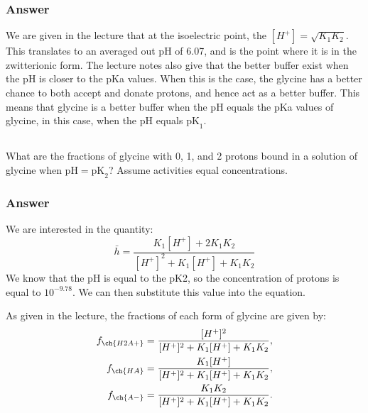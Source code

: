 \documentclass[12pt]{article}
\begin{document}
\subsubsection{Answer}
We are given in the lecture that at the isoelectric point, the $[H^+] = \sqrt{K_1K_2}$. This translates to an averaged out pH of 6.07, and is the point where it is in the zwitterionic form. The lecture notes also give that the better buffer exist when the pH is closer to the pKa values. When this is the case, the glycine has a better chance to both accept and donate protons, and hence act as a better buffer. This means that glycine is a better buffer when the pH equals the pKa values of glycine, in this case, when the pH equals $\mathrm{pK}_{1}$.

\subsection{}


What are the fractions of glycine with 0, 1, and 2 protons bound in a solution of glycine when $\mathrm{pH}=\mathrm{pK}_{2}$? Assume activities equal concentrations.
\subsubsection{Answer}
We are interested in the quantity:
\begin{equation}
  \bar{h} = \frac{K_1 [H^+] + 2K_1K_2}{[H^+]^2 + K_1[H^+] + K_1K_2}
\end{equation}
We know that the pH is equal to the pK2, so the concentration of protons is equal to $10^{-9.78}$. We can then substitute this value into the equation.

As given in the lecture, the fractions of each form of glycine are given by:
\begin{align*}
  f_{\ch{H2A+}} &= \frac{[H^+]^2}{[H^+]^2 + K_1 [H^+] + K_1 K_2}, \\
  f_{\ch{HA}} &= \frac{K_1 [H^+]}{[H^+]^2 + K_1 [H^+] + K_1 K_2}, \\
  f_{\ch{A-}} &= \frac{K_1 K_2}{[H^+]^2 + K_1 [H^+] + K_1 K_2}.
\end{align*}
\end{document}
